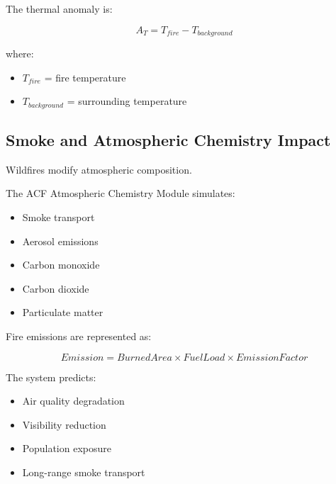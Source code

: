The thermal anomaly is:

\[
A_T=
T_{fire}
-
T_{background}
\]


where:

\begin{itemize}

\item $T_{fire}$ = fire temperature

\item $T_{background}$ = surrounding temperature

\end{itemize}



\subsection{Smoke and Atmospheric Chemistry Impact}

Wildfires modify atmospheric composition.

The ACF Atmospheric Chemistry Module simulates:

\begin{itemize}

\item Smoke transport

\item Aerosol emissions

\item Carbon monoxide

\item Carbon dioxide

\item Particulate matter

\end{itemize}


Fire emissions are represented as:

\[
Emission=
BurnedArea
\times
FuelLoad
\times
EmissionFactor
\]


The system predicts:

\begin{itemize}

\item Air quality degradation

\item Visibility reduction

\item Population exposure

\item Long-range smoke transport

\end{itemize}


